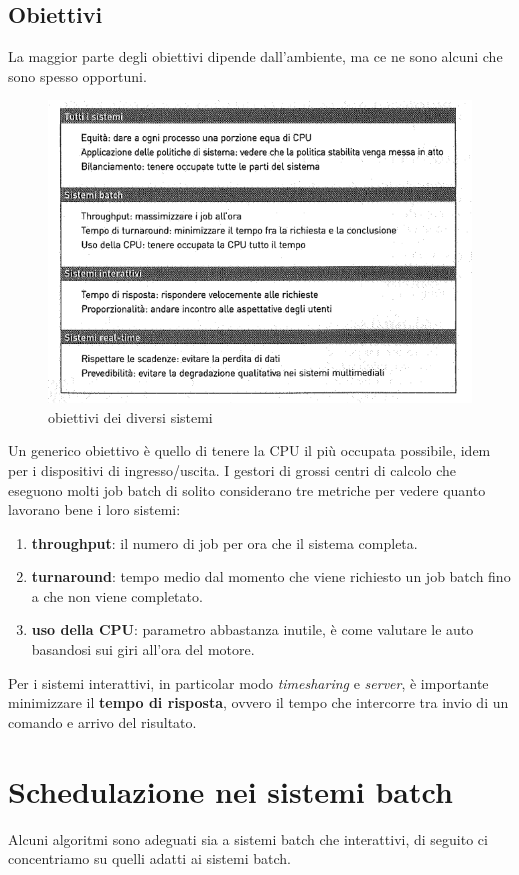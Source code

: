 \subsection{Obiettivi}
La maggior parte degli obiettivi dipende dall'ambiente, ma ce ne sono alcuni che sono spesso opportuni.

\begin{figure}[H]
    \centering
    \includegraphics[width=0.6\linewidth]{assets/obiettivi4.png}
    \caption{obiettivi dei diversi sistemi}
\end{figure}


Un generico obiettivo è quello di tenere la CPU il più occupata possibile, idem per i dispositivi di ingresso/uscita. 
I gestori di grossi centri di calcolo che eseguono molti job batch di solito considerano tre metriche per vedere quanto lavorano bene i loro sistemi:
\begin{enumerate}
    \item \textbf{throughput}: il numero di job per ora che il sistema completa.
    \item \textbf{turnaround}: tempo medio dal momento che viene richiesto un job batch fino a che non viene completato.
    \item \textbf{uso della CPU}: parametro abbastanza inutile, è come valutare le auto basandosi sui giri all'ora del motore.
\end{enumerate}

Per i sistemi interattivi, in particolar modo \textit{timesharing} e \textit{server}, è importante minimizzare il \textbf{tempo di risposta}, ovvero il tempo che intercorre tra invio di un comando e arrivo del risultato.

\section{Schedulazione nei sistemi batch}

Alcuni algoritmi sono adeguati sia a sistemi batch che interattivi, di seguito ci concentriamo su quelli adatti ai sistemi batch.

